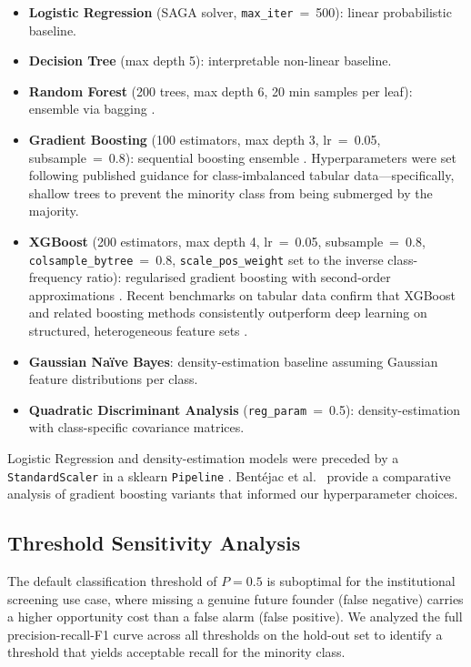 \documentclass[10pt,twocolumn]{article}
\newenvironment{compactitem}{%
  \begin{itemize}%
  \setlength{\itemsep}{1pt}\setlength{\parskip}{0pt}\setlength{\parsep}{0pt}%
}{\end{itemize}}
\begin{document}
\begin{compactitem}
  \item \textbf{Logistic Regression} (SAGA solver, \texttt{max\_iter}~=~500): linear probabilistic baseline.
  \item \textbf{Decision Tree} (max depth 5): interpretable non-linear baseline.
  \item \textbf{Random Forest} (200 trees, max depth 6, 20 min samples per leaf): ensemble via bagging \cite{breiman2001}.
  \item \textbf{Gradient Boosting} (100 estimators, max depth 3, lr~=~0.05, subsample~=~0.8): sequential boosting ensemble \cite{friedman2001}. Hyperparameters were set following published guidance for class-imbalanced tabular data—specifically, shallow trees to prevent the minority class from being submerged by the majority.
  \item \textbf{XGBoost} (200 estimators, max depth 4, lr~=~0.05, subsample~=~0.8, \texttt{colsample\_bytree}~=~0.8, \texttt{scale\_pos\_weight} set to the inverse class-frequency ratio): regularised gradient boosting with second-order approximations \cite{chen2016}. Recent benchmarks on tabular data confirm that XGBoost and related boosting methods consistently outperform deep learning on structured, heterogeneous feature sets \cite{naveenkumar2026}.
  \item \textbf{Gaussian Na\"{i}ve Bayes}: density-estimation baseline assuming Gaussian feature distributions per class.
  \item \textbf{Quadratic Discriminant Analysis} (\texttt{reg\_param}~=~0.5): density-estimation with class-specific covariance matrices.
\end{compactitem}

Logistic Regression and density-estimation models were preceded by a \texttt{StandardScaler} in a sklearn \texttt{Pipeline} \cite{pedregosa2011}. Bentéjac et al.\ \cite{karimabdallah2025} provide a comparative analysis of gradient boosting variants that informed our hyperparameter choices.

\subsection{Threshold Sensitivity Analysis}

The default classification threshold of $P = 0.5$ is suboptimal for the institutional screening use case, where missing a genuine future founder (false negative) carries a higher opportunity cost than a false alarm (false positive). We analyzed the full precision-recall-F1 curve across all thresholds on the hold-out set to identify a threshold that yields acceptable recall for the minority class.
\end{document}
